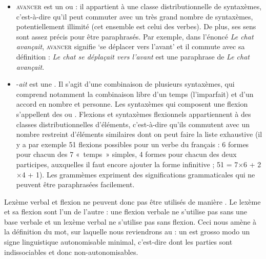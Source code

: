 \begin{itemize}
\item \textsc{avancer} est un  ou : il appartient à une classe distributionnelle  de syntaxèmes, c’est-à-dire qu’il peut commuter avec un très grand nombre de syntaxèmes, potentiellement illimité (cet ensemble est celui des verbes). De plus, ses sens sont assez précis pour être paraphrasés. Par exemple, dans l’énoncé \textit{Le chat avançait}, \textsc{avancer} signifie ‘se déplacer vers l’avant’ et il commute avec sa définition : \textit{Le chat se déplaçait vers l’avant} est une paraphrase de \textit{Le chat avançait}.
\item {}-\textit{ait} est une . Il s’agit d’une combinaison de plusieurs syntaxèmes, qui comprend notamment la combinaison libre d’un temps (l’imparfait) et d’un accord en nombre et personne. Les syntaxèmes qui composent une flexion s’appellent des  ou . Flexions et syntaxèmes flexionnels appartiennent à des classes distributionnelles  d’éléments, c’est-à-dire qu’ils commutent avec un nombre restreint d’éléments similaires dont on peut faire la liste exhaustive (il y a par exemple 51 flexions possibles pour un verbe du français : 6 formes pour chacun des 7 «~temps~» simples, 4 formes pour chacun des deux participes, auxquelles il faut encore ajouter la forme infinitive ; 51 = 7${\times}$6 + 2${\times}$4 + 1). Les grammèmes expriment des significations grammaticales qui ne peuvent être paraphrasées facilement.
\end{itemize}

Lexème verbal et flexion ne peuvent donc pas être utilisés de manière . Le lexème et sa flexion sont  l’un de l’autre : une flexion verbale ne s’utilise pas sans une base verbale et un lexème verbal ne s’utilise pas sans flexion. Ceci nous amène à la définition du mot, sur laquelle nous reviendrons au  : un  est grosso modo un signe linguistique autonomisable minimal, c’est-dire dont les parties sont indissociables et donc non-autonomisables.

